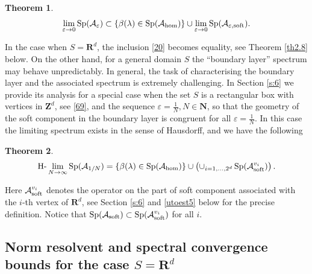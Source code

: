 \documentclass[11pt]{article}
\newcommand\e {\varepsilon}
\newcommand\soft{{\rm soft}}
\newcommand{\R}{\mathbf{R}}
\def\AA{\mathcal{A}}
\def\l{\lambda}
\def\hom{{\rm hom}}
\DeclareMathOperator{\Sp}{Sp}
\newcommand\N{\mathbf{N}}
\newcommand\Z{\mathbf{Z}}
\newtheorem{theorem}{Theorem}[section]
\theoremstyle{remark}
\begin{document}
\begin{theorem}\label{th2.6}
	\begin{equation*}%
		\lim_{\e\to 0} \Sp(\AA_\e) \subset	\{\beta(\l) \in \Sp (\AA_\hom)\} \cup  \lim_{\e\to 0}\Sp (\AA_{\e,\rm soft}).
	\end{equation*}
\end{theorem}


In the case when $S = \R^d$, the inclusion \eqref{20} becomes  equality, see Theorem \ref{th2.8} below. On the other hand, for a general domain $S$ the ``boundary layer'' spectrum may behave unpredictably. In general, the task of characterising the boundary layer and the associated spectrum is extremely challenging. In Section \ref{s:6} we provide its analysis for a special case when the set $S$ is a rectangular box with vertices in $\Z^d$, see \eqref{69}, and the sequence $\e = \frac{1}{N}, N\in \N$, so that the geometry of the soft component in the boundary layer is congruent for all  $\e = \frac{1}{N}$.  In this case the limiting spectrum exists in the sense of Hausdorff, and we have the following
\begin{theorem}\label{th2.7}
	\begin{equation*}
		{\rm H}\mbox{-}\lim_{N\to \infty} \Sp(\AA_{1/N}) =	\{ \beta(\l) \in \Sp (\AA_\hom)\}  \cup \left( \cup_{i=1,\dots,2^d} \Sp(\AA_\soft^{v_i})\right).
	\end{equation*}
\end{theorem}
Here $\AA_\soft^{v_i}$ denotes the operator on the part of soft component associated with the $i$-th vertex of $\R^d$, see Section \ref{s:6} and \eqref{utoest5} below for the precise definition. Notice that $\Sp(\AA_\soft) \subset \Sp(\AA_\soft^{v_i})$ for all $i$.

\subsection{ Norm resolvent and spectral convergence bounds for the case  $S=\R^d$}\label{s2.3}
\end{document}
